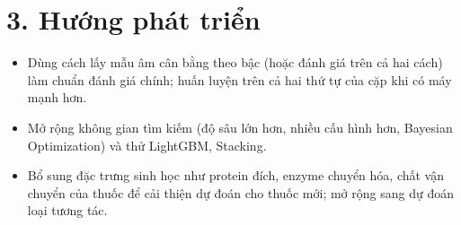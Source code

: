 \documentclass[12pt,a4paper,oneside]{report}
\begin{document}
\section*{3. Hướng phát triển}
\begin{itemize}
  \item Dùng cách lấy mẫu âm cân bằng theo bậc (hoặc đánh giá trên cả hai cách) làm
        chuẩn đánh giá chính; huấn luyện trên cả hai thứ tự của cặp khi có máy mạnh hơn.
  \item Mở rộng không gian tìm kiếm (độ sâu lớn hơn, nhiều cấu hình hơn, Bayesian
        Optimization) và thử LightGBM, Stacking.
  \item Bổ sung đặc trưng sinh học như protein đích, enzyme chuyển hóa, chất vận
        chuyển của thuốc để cải thiện dự đoán cho thuốc mới; mở rộng sang dự đoán
        loại tương tác.
\end{itemize}

\end{document}
